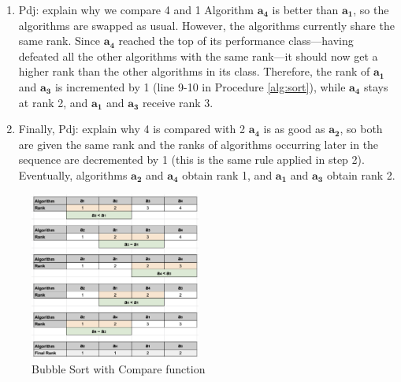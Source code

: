 \documentclass[conference]{IEEEtran}
\newcommand{\p}[1]{{\color{blue} Pdj: #1}}
\begin{document}
\begin{enumerate}
	\item
          \p{explain why we compare 4 and 1}
          Algorithm $\mathbf{a_4}$ is better than $\mathbf{a_1}$, so the algorithms are swapped as usual. However, the
          algorithms currently share the same rank. Since $\mathbf{a_4}$ reached the top of its performance
          class---having defeated all the other algorithms with the same rank---it should now get a higher rank than the
          other algorithms in its class. Therefore, the rank of $\mathbf{a_1}$ and $\mathbf{a_3}$ is incremented by 1
          (line 9-10 in Procedure \ref{alg:sort}), while $\mathbf{a_4}$ stays at rank 2, and $\mathbf{a_1}$ and $\mathbf{a_3}$ receive rank 3.
	
	\item
          Finally, \p{explain why 4 is compared with 2}
          $\mathbf{a_4}$ is as good as $\mathbf{a_2}$, so both are given the same rank and the ranks of algorithms
          occurring later in the sequence are decremented by 1 (this is the same rule applied in step 2). Eventually,
          algorithms $\mathbf{a_2}$ and $\mathbf{a_4}$ obtain rank 1, and $\mathbf{a_1}$ and $\mathbf{a_3}$ obtain rank 2.
\end{enumerate}

\begin{figure}
	\includegraphics[width=0.5\textwidth]{fig/ranking}
	\caption{Bubble Sort with Compare function}
	\label{fig:sort}
\end{figure}
\end{document}
